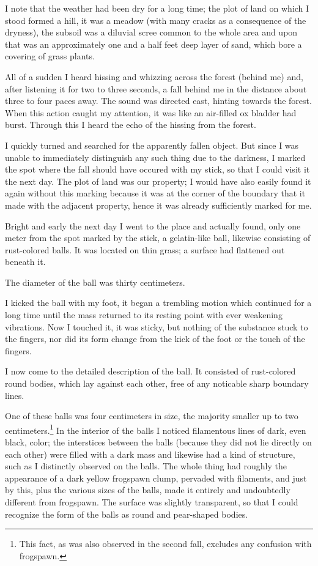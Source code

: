 \documentclass[a4paper, 12pt, oneside]{article}
\begin{document}
I note that the weather had been dry for a long time; the plot of land on which I stood formed a hill, it was a meadow (with many cracks as a consequence of the dryness), the subsoil was a diluvial scree common to the whole area and upon that was an approximately one and a half feet deep layer of sand, which bore a covering of grass plants.

All of a sudden I heard hissing and whizzing across the forest (behind me) and, after listening it for two to three seconds, a fall behind me in the distance about three to four paces away. The sound was directed east, hinting towards the forest. When this action caught my attention, it was like an air-filled ox bladder had burst. Through this I heard the echo of the hissing from the forest.

I quickly turned and searched for the apparently fallen object. But since I was unable to immediately distinguish any such thing due to the darkness, I marked the spot where the fall should have occured with my stick, so that I could visit it the next day. The plot of land was our property; I would have also easily found it again without this marking because it was at the corner of the boundary that it made with the adjacent property, hence it was already sufficiently marked for me.

Bright and early the next day I went to the place and actually found, only one meter from the spot marked by the stick, a gelatin-like ball, likewise consisting of rust-colored balls. It was located on thin grass; a surface had flattened out beneath it.

The diameter of the ball was thirty centimeters.

I kicked the ball with my foot, it began a trembling motion which continued for a long time until the mass returned to its resting point with ever weakening vibrations. Now I touched it, it was sticky, but nothing of the substance stuck to the fingers, nor did its form change from the kick of the foot or the touch of the fingers.

I now come to the detailed description of the ball. It consisted of rust-colored round bodies, which lay against each other, free of any noticable sharp boundary lines.

One of these balls was four centimeters in size, the majority smaller up to two centimeters.\footnote{This fact, as was also observed in the second fall, excludes any confusion with frogspawn.} In the interior of the balls I noticed filamentous lines of dark, even black, color; the interstices between the balls (because they did not lie directly on each other) were filled with a dark mass and likewise had a kind of structure, such as I distinctly observed on the balls. The whole thing had roughly the appearance of a dark yellow frogspawn clump, pervaded with filaments, and just by this, plus the various sizes of the balls, made it entirely and undoubtedly different from frogspawn. The surface was slightly transparent, so that I could recognize the form of the balls as round and pear-shaped bodies.
\end{document}
